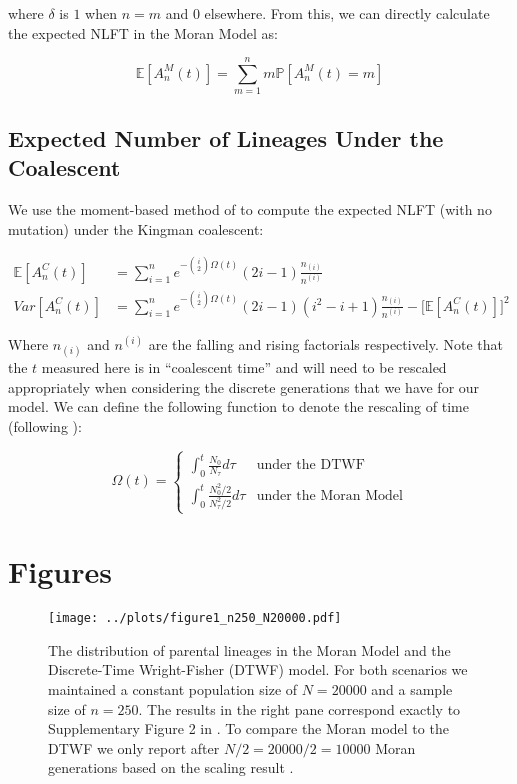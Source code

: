 \documentclass[10.5pt]{article}
\begin{document}
where $\delta$ is $1$ when $n = m$ and $0$ elsewhere. From this, we can directly calculate the expected NLFT in the Moran Model as:

 \begin{equation}
	 \mathbb{E}[A^M_n(t)] = \sum^n_{m=1} m \mathbb{P}[A^M_n (t) = m]
 \end{equation}


\subsection{Expected Number of Lineages Under the Coalescent}

We use the moment-based method of \citet{Tavare1984} to compute the expected NLFT (with no mutation) under the Kingman coalescent:

\begin{equation}
\begin{aligned}
	\mathbb{E}[A^C_n(t)] &= \sum^n_{i=1} e^{-\binom{i}{2}\Omega(t)} (2i - 1) \frac{n_{(i)}}{n^{(i)}}\\
	Var[A^C_n(t)] &= \sum^n_{i=1} e^{-\binom{i}{2}\Omega(t)}(2i-1)(i^2 - i + 1)\frac{n_{(i)}}{n^{(i)}} - \Bigg[\mathbb{E}[A^C_n(t)]\Bigg]^2
\end{aligned}
\end{equation}

Where $n_{(i)}$ and $n^{(i)}$ are the falling and rising factorials respectively. Note that the $t$ measured here is in ``coalescent time'' and will need to be rescaled appropriately when considering the discrete generations that we have for our model. We can define the following function to denote the rescaling of time (following \citet{Bhaskar2014}):

\begin{equation}
	\Omega(t) = \begin{cases}
		\int_{0}^t \frac{N_0}{N_\tau} d\tau &\text{under the DTWF}\\[2ex]
		\int_{0}^t \frac{N_0^2/2}{N_\tau^2/2} d\tau  &\text{under the Moran Model}
	\end{cases}
\end{equation}





\newpage
\section{Figures}

\begin{figure}[H]
	\centering
	\captionsetup{width=0.75\textwidth}
	\texttt{[image: ../plots/figure1\_n250\_N20000.pdf]}
	\caption{The distribution of parental lineages in the Moran Model and the Discrete-Time Wright-Fisher (DTWF) model. For both scenarios we maintained a constant population size of $N = 20000$ and a sample size of $n=250$. The results in the right pane correspond exactly to Supplementary Figure 2 in \citet{Bhaskar2014}. To compare the Moran model to the DTWF we only report after $N/2 = 20000/2 = 10000$ Moran generations based on the scaling result \citep{Wakeley2008}.}
\end{figure}\label{fig:1}
\end{document}
